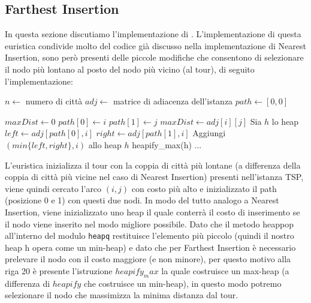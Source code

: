 \documentclass[a4paper,12pt]{report}
\begin{document}
\subsection{Farthest Insertion}
In questa sezione discutiamo l'implementazione di . L'implementazione di questa euristica condivide molto del codice già discusso nella implementazione di Nearest Insertion, sono però presenti delle piccole modifiche che consentono di selezionare il nodo più lontano al posto del nodo più vicino (al tour), di seguito l'implementazione:
\begin{tcolorbox}[colframe=black, colback=white, boxrule=0.5pt, title=Farthest Insertion, coltitle=black, fonttitle=\bfseries, colbacktitle=white, breakable]
  \begin{algorithmic}[1]
    \State $n \gets$ numero di città
    \State $adj \gets$ matrice di adiacenza dell'istanza
    \State $path \gets [0, 0]$
    
    \State $maxDist \gets 0$
          \State $path[0] \gets i$
          \State $path[1] \gets j$
          \State $maxDist \gets adj[i][j]$
        \EndIf
      \EndFor
    \EndFor
    \State Sia $h$ lo heap
      \State $left \gets adj[path[0], i]$
      \State $right \gets adj[path[1], i]$
      \State Aggiungi $(min\{left, right\}, i)$ allo heap $h$
    \EndFor
    \State heapify\_max(h)
    \State ...
  \end{algorithmic}
  \end{tcolorbox}
L'euristica inizializza il tour con la coppia di città più lontane (a differenza della coppia di città più vicine nel caso di Nearest Insertion) presenti nell'istanza TSP, viene quindi cercato l'arco $(i, j)$ con costo più alto e inizializzato il path (posizione 0 e 1) con questi due nodi.
In modo del tutto analogo a Nearest Insertion, viene inizializzato uno heap il quale conterrà il costo di inserimento se il nodo viene inserito nel modo migliore possibile. Dato che il metodo heappop all'interno del modulo \lstinline!heapq! restituisce l'elemento più piccolo (quindi il nostro heap h opera come un min-heap) e dato che per Farthest Insertion è necessario prelevare il nodo con il costo maggiore (e non minore), per questo motivo alla riga 20 è presente l'istruzione $heapify_max$ la quale costruisce un max-heap (a differenza di $heapify$ che costruisce un min-heap), in questo modo potremo selezionare il nodo che massimizza la minima distanza dal tour.
\end{document}
